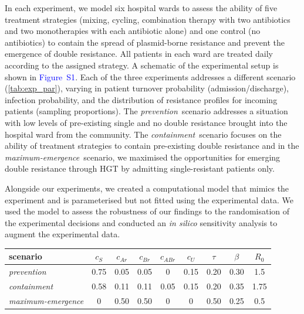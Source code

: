 \documentclass[9pt,twocolumn,twoside,lineno]{pnas-new}
\newcommand{\sifig}[1]{\textcolor{blue}{Figure~S#1}}
\begin{document}
    In each experiment, we model six hospital wards to assess the ability of five treatment strategies (mixing, cycling, combination therapy with two antibiotics and two monotherapies with each antibiotic alone) and one control (no antibiotics) to contain the spread of plasmid-borne resistance and prevent the emergence of double resistance. 
    All patients in each ward are treated daily according to the assigned strategy.
    A schematic of the experimental setup is shown in \sifig{1}.
    Each of the three experiments addresses a different scenario (\autoref{tab:exp_par}), varying in patient turnover probability (admission/discharge),  infection probability, and the distribution of resistance profiles for incoming patients (sampling proportions). 
    The \textit{prevention}~scenario addresses a situation with low levels of pre-existing single and no double resistance brought into the hospital ward from the community.
    The \textit{containment}~scenario focuses on the ability of treatment strategies to contain pre-existing double resistance and in the \textit{maximum-emergence}~scenario, we maximised the opportunities for emerging double resistance through HGT by admitting single-resistant patients only.
    
    Alongside our experiments, we created a computational model that mimics the experiment and is parameterised but not fitted using the experimental data.
    We used the model to assess the robustness of our findings to the randomisation of the experimental decisions and conducted an \textit{in silico} sensitivity analysis to augment the experimental data.
    
    \begin{table}[b]
        \centering
        \captionsetup[table]{skip=3pt}
        \renewcommand{\arraystretch}{1.1} %
        \setlength{\tabcolsep}{4.5pt} %
    
    
        \label{tab:exp_par}
        \begin{tabular}{p{1.5cm}|ccccccc|c}
            \toprule
             \textbf{scenario} & $c_{S}$ & $c_{Ar}$ & $c_{Br}$ & $c_{ABr}$  & $c_{U}$ & $\tau$ & $\beta$ & $R_0$\\ 
             \midrule
             \textit{prevention}   & 0.75 & 0.05 & 0.05 & 0 & 0.15 & 0.20 & 0.30 & 1.5\\
             \textit{containment}  & 0.58 & 0.11 & 0.11 & 0.05 & 0.15 & 0.20 & 0.35 & 1.75\\
             \textit{maximum-emergence} & 0 & 0.50 & 0.50 & 0 & 0 & 0.50 & 0.25 & 0.5 \\
             \bottomrule
        \end{tabular}
    \end{table}
    
\end{document}
